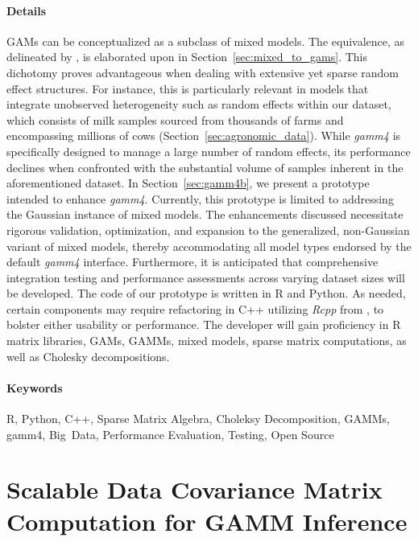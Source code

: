 \paragraph{Details} GAMs can be conceptualized as a subclass of mixed models. The equivalence, as delineated by \cite{wood_stable_2004}, is elaborated upon in Section~\ref{sec:mixed_to_gams}. This dichotomy proves advantageous when dealing with extensive yet sparse random effect structures. For instance, this is particularly relevant in models that integrate unobserved heterogeneity such as random effects within our dataset, which consists of milk samples sourced from thousands of farms and encompassing millions of cows (Section~\ref{sec:agronomic_data}). While \textit{gamm4} is specifically designed to manage a large number of random effects, its performance declines when confronted with the substantial volume of samples inherent in the aforementioned dataset. In Section~\ref{sec:gamm4b}, we present a prototype intended to enhance \textit{gamm4}. Currently, this prototype is limited to addressing the Gaussian instance of mixed models. The enhancements discussed necessitate rigorous validation, optimization, and expansion to the generalized, non-Gaussian variant of mixed models, thereby accommodating all model types endorsed by the default \textit{gamm4} interface. Furthermore, it is anticipated that comprehensive integration testing and performance assessments across varying dataset sizes will be developed. The code of our prototype is written in R and Python. As needed, certain components may require refactoring in C++ utilizing \textit{Rcpp} from \cite{rcpp}, to bolster either usability or performance. The developer will gain proficiency in R matrix libraries, GAMs, GAMMs, mixed models, sparse matrix computations, as well as Cholesky decompositions.

\paragraph{Keywords} R, Python, C++, Sparse Matrix Algebra, Choleksy Decomposition, GAMMs, gamm4, Big~Data, Performance Evaluation, Testing, Open Source

\newpage

\section{Scalable Data Covariance Matrix Computation for GAMM Inference}
